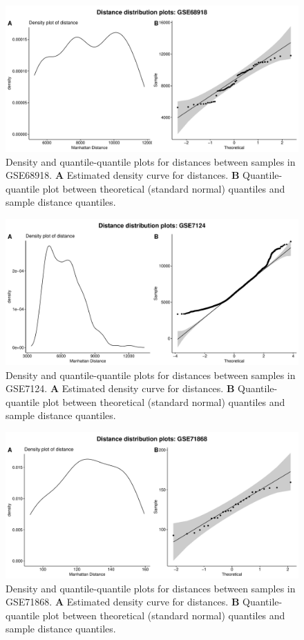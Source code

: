 \documentclass[10pt,letterpaper]{article}\usepackage[]{graphicx}\usepackage[]{color}
\begin{document}
\begin{figure}[H]
	\includegraphics[width=\textwidth]{manhattan-distance_hist_GSE68918.pdf}
	\caption{Density and quantile-quantile plots for distances between samples in GSE68918. \textbf{A} Estimated density curve for distances. \textbf{B} Quantile-quantile plot between theoretical (standard normal) quantiles and sample distance quantiles.}
\end{figure}

\begin{figure}[H]
	\includegraphics[width=\textwidth]{manhattan-distance_hist_GSE7124.pdf}
	\caption{Density and quantile-quantile plots for distances between samples in GSE7124. \textbf{A} Estimated density curve for distances. \textbf{B} Quantile-quantile plot between theoretical (standard normal) quantiles and sample distance quantiles.}
\end{figure}

\begin{figure}[H]
	\includegraphics[width=\textwidth]{manhattan-distance_hist_GSE71868.pdf}
	\caption{Density and quantile-quantile plots for distances between samples in GSE71868. \textbf{A} Estimated density curve for distances. \textbf{B} Quantile-quantile plot between theoretical (standard normal) quantiles and sample distance quantiles.}
\end{figure}
\end{document}
